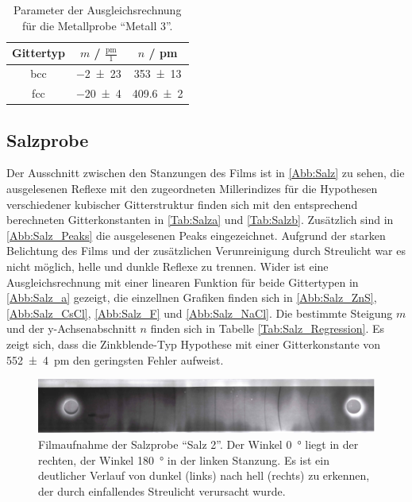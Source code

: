 \begin{table}[H]
  \centering
  \caption{Parameter der Ausgleichsrechnung für die Metallprobe \enquote{Metall 3}.}
  \label{Tab:Metall_Regression}
  \begin{tabular}{c | c c }
    \toprule
    Gittertyp &
    $m$ / $\frac{\mathrm{pm}}{1}$ &
    $n$ / pm \\
    \midrule
    bcc & \num{-2(23)} & \num{353(13)} \\
    fcc & \num{-20(4)} & \num{409.6(20)} \\
    \bottomrule
  \end{tabular}
\end{table}

\subsection{Salzprobe}
Der Ausschnitt zwischen den Stanzungen des Films ist in \autoref{Abb:Salz}
zu sehen, die ausgelesenen Reflexe mit den zugeordneten Millerindizes für die
Hypothesen verschiedener kubischer Gitterstruktur finden sich mit den entsprechend
berechneten Gitterkonstanten in \autoref{Tab:Salza} und \autoref{Tab:Salzb}.
Zusätzlich sind in \autoref{Abb:Salz_Peaks} die ausgelesenen Peaks eingezeichnet.
Aufgrund der starken Belichtung des Films und der zusätzlichen Verunreinigung durch Streulicht
war es nicht möglich, helle und dunkle Reflexe zu trennen.
Wider ist eine Ausgleichsrechnung mit einer linearen Funktion für beide Gittertypen in
\autoref{Abb:Salz_a} gezeigt, die einzellnen Grafiken finden sich in \autoref{Abb:Salz_ZnS},
\autoref{Abb:Salz_CsCl}, \autoref{Abb:Salz_F} und \autoref{Abb:Salz_NaCl}. Die bestimmte Steigung $m$ und der y-Achsenabschnitt $n$
finden sich in Tabelle \autoref{Tab:Salz_Regression}.
Es zeigt sich, dass die Zinkblende-Typ Hypothese mit einer Gitterkonstante von
\SI{552(4)}{\pico\metre} den geringsten Fehler aufweist.

\begin{figure}
  \centering
  \includegraphics[scale=0.5]{content/pics/Salz_film.pdf}
  \caption{Filmaufnahme der Salzprobe \enquote{Salz 2}. Der Winkel \SI{0}{\degree} liegt in der
  rechten, der Winkel \SI{180}{\degree} in der linken Stanzung. Es ist ein
  deutlicher Verlauf von dunkel (links) nach hell (rechts) zu erkennen, der durch
  einfallendes Streulicht verursacht wurde.}
  \label{Abb:Salz}
\end{figure}

